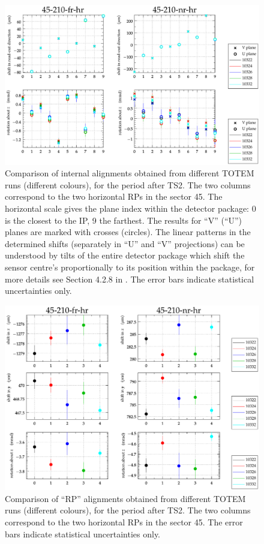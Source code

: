 \documentclass[TOTEM]{cern/cernphprep}
\begin{document}
\begin{figure}[h!]
\begin{center}
\includegraphics[width=0.8\hsize]{fig/after_TS2/plots_per_plane_left.pdf}
\caption{%
Comparison of internal alignments obtained from different TOTEM runs (different colours), for the period after TS2. The two columns correspond to the two horizontal RPs in the sector 45. The horizontal scale gives the plane index within the detector package: 0 is the closest to the IP, 9 the farthest. The results for ``V'' (``U'') planes are marked with crosses (circles). The linear patterns in the determined shifts (separately in ``U'' and ``V'' projections) can be understood by tilts of the entire detector package which shift the sensor centre's proportionally to its position within the package, for more details see Section 4.2.8 in \cite{jan_thesis}. The error bars indicate statistical uncertainties only.
}
\label{fig:tb_example_internal}
\end{center}
\end{figure}

\begin{figure}[h!]
\begin{center}
\includegraphics[width=0.8\hsize]{fig/after_TS2/plots_per_rp_left.pdf}
\caption{%
Comparison of ``RP'' alignments obtained from different TOTEM runs (different colours), for the period after TS2. The two columns correspond to the two horizontal RPs in the sector 45. The error bars indicate statistical uncertainties only.
}
\label{fig:tb_example_rp}
\end{center}
\end{figure}
\end{document}
